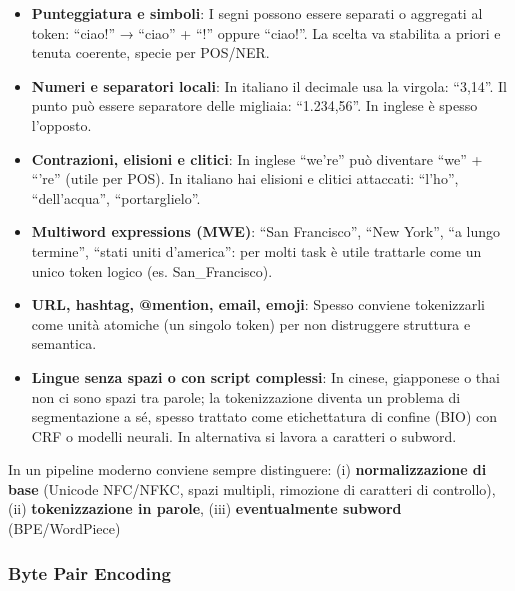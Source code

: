             \begin{itemize}
                
                \item \textbf{Punteggiatura e simboli}: I segni possono essere separati o aggregati al token: “ciao!” → “ciao” + “!” oppure “ciao!”. La scelta va stabilita a priori e tenuta coerente, specie per POS/NER.
                
                \item \textbf{Numeri e separatori locali}: In italiano il decimale usa la virgola: “3,14”. Il punto può essere separatore delle migliaia: “1.234,56”. In inglese è spesso l’opposto.
                
                \item \textbf{Contrazioni, elisioni e clitici}: In inglese “we’re” può diventare “we” + “’re” (utile per POS). In italiano hai elisioni e clitici attaccati: “l’ho”, “dell’acqua”, “portarglielo”.
                
                \item \textbf{Multiword expressions (MWE)}: “San Francisco”, “New York”, “a lungo termine”, “stati uniti d’america”: per molti task è utile trattarle come un unico token logico (es. San\_Francisco).
                
                \item \textbf{URL, hashtag, @mention, email, emoji}:  Spesso conviene tokenizzarli come unità atomiche (un singolo token) per non distruggere struttura e semantica.
                
                \item \textbf{Lingue senza spazi o con script complessi}: In cinese, giapponese o thai non ci sono spazi tra parole; la tokenizzazione diventa un problema di segmentazione a sé, spesso trattato come etichettatura di confine (BIO) con CRF o modelli neurali. In alternativa si lavora a caratteri o subword.
                
            \end{itemize}

            In un pipeline moderno conviene sempre distinguere: (i) \textbf{normalizzazione di base} (Unicode NFC/NFKC, spazi multipli, rimozione di caratteri di controllo), (ii) \textbf{tokenizzazione in parole}, (iii) \textbf{eventualmente subword} (BPE/WordPiece)
        
        \subsubsection{Byte Pair Encoding}
        
